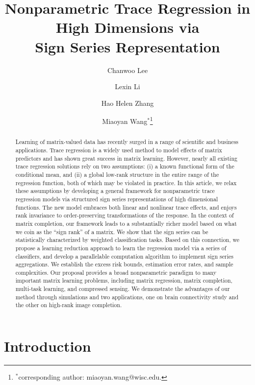 \documentclass[11pt]{article}
\title{Nonparametric Trace Regression in High Dimensions via \\Sign Series Representation}
\author[1]{Chanwoo Lee}
\author[2]{Lexin Li}
\author[3]{Hao Helen Zhang}
\author[1]{Miaoyan Wang$^*$\footnote{$^*$corresponding author: miaoyan.wang@wisc.edu. }}
\affil[1]{Department of Statistics, University of Wisconsin--Madison}
\affil[2]{Division of Biostatistics, University of California--Berkley}
\affil[3]{Department of Mathematics, University of Arizona}
\date{}
\theoremstyle{plain}
\theoremstyle{definition}
\begin{document}
\maketitle



\begin{abstract}
Learning of matrix-valued data has recently surged in a range of scientific and business applications. Trace regression is a widely used method to model effects of matrix predictors and has shown great success in matrix learning. However, nearly all existing trace regression solutions rely on two assumptions: (i) a known functional form of the conditional mean, and (ii) a global low-rank structure in the entire range of the regression function, both of which may be violated in practice. In this article, we relax these assumptions by developing a general framework for nonparametric trace regression models via structured sign series representations of high dimensional functions. The new model embraces both linear and nonlinear trace effects, and enjoys rank invariance to order-preserving transformations of the response. In the context of matrix completion, our framework leads to a substantially richer model based on what we coin as the ``sign rank'' of a matrix. We show that the sign series can be statistically characterized by weighted classification tasks. Based on this connection, we propose a learning reduction approach to learn the regression model via a series of classifiers, and develop a parallelable computation algorithm to implement sign series aggregations. We establish the excess risk bounds, estimation error rates, and sample complexities. Our proposal provides a broad nonparametric paradigm to many important matrix learning problems, including matrix regression, matrix completion, multi-task learning, and compressed sensing. We demonstrate the advantages of our method through simulations and two applications, one on brain connectivity study and the other on high-rank image completion. 
\end{abstract}


\section{Introduction}
\label{sec:intro}
\end{document}
